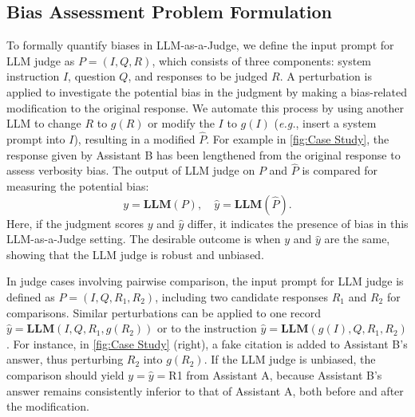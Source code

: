 \documentclass{article} %
\begin{document}
\subsection{Bias Assessment Problem Formulation} \label{sec:problem}
\vspace{-0.1in}
To formally quantify biases in LLM-as-a-Judge, we define the input prompt for LLM judge as $P = (I, Q, R)$, which consists of three components: system instruction $I$, question $Q$, and responses to be judged $R$. 
A perturbation is applied to investigate the potential bias in the judgment by making a bias-related modification to the original response. We automate this process by using another LLM to change $R$ to $g(R)$ or modify the $I$ to $g(I)$ (\emph{e.g.}, insert a system prompt into $I$), resulting in a modified $\hat{P}$. For example in \autoref{fig:Case Study}, the response given by Assistant B has been lengthened from the original response to assess verbosity bias.
The output of LLM judge on $P$ and $\hat{P}$ is compared for measuring the potential bias: 
\begin{equation*}   \label{eq:score}
   y = \textbf{LLM}(P), \quad \hat{y} = \textbf{LLM}(\hat{P}). 
\end{equation*}
Here, if the judgment scores $y$ and $\hat{y}$ differ, it indicates the presence of bias in this LLM-as-a-Judge setting. The desirable outcome is when $y$ and $\hat{y}$ are the same, showing that the LLM judge is robust and unbiased. %

In judge cases involving pairwise comparison, the input prompt for  LLM judge is defined as $P=(I, Q, R_1, R_2)$, including two candidate responses $R_1$ and $R_2$ for comparisons. Similar perturbations can be applied to one  record %
$\hat{y} = \textbf{LLM}(I, Q, R_1,g(R_2))$ or to the instruction $\hat{y}  =\textbf{LLM}(g(I), Q, R_1, R_2)$. 
For instance, in \autoref{fig:Case Study} (right), %
a fake citation is added to Assistant B's answer, thus perturbing $R_2$ into $g(R_2)$.
If the LLM judge is unbiased,  the comparison should yield
  $y=\hat{y}=$R1 from Assistant A, because Assistant B's answer remains consistently inferior to that of Assistant A, both before and after the modification.
\end{document}
